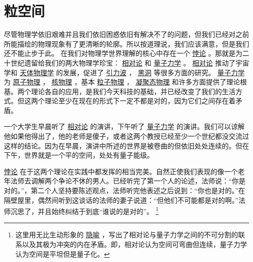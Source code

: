 	\chapter{粒空间}
\indent

    尽管物理学依旧艰难并且我们依旧困惑依旧有解决不了的问题，但我们已经对之前所能描绘的物理现象有了更清晰的轮廓。所以按道理说，我们应该满意，但是我们还不能止步于此。
    在我们对物理学世界理解的核心中存在一个
\href{http://toyhouse.cc/wiki/index.php/悖论}{悖论}
。那就是为二十世纪遗留给我们的两大物理学珍宝：
\href{http://toyhouse.cc/wiki/index.php/相对论}{相对论}
和
\href{http://toyhouse.cc/wiki/index.php/量子力学}{量子力学}
。
\href{http://toyhouse.cc/wiki/index.php/相对论}{相对论}
推动了宇宙学和
\href{http://toyhouse.cc/wiki/index.php/天体物理学}{天体物理学}
的发展，促进了
\href{http://toyhouse.cc/wiki/index.php/引力波}{引力波}
，
\href{http://toyhouse.cc/wiki/index.php/黑洞}{黑洞}
等很多方面的研究。
\href{http://toyhouse.cc/wiki/index.php/量子力学}{量子力学}
为
\href{http://toyhouse.cc/wiki/index.php/原子物理}{原子物理}
，
\href{http://toyhouse.cc/wiki/index.php/核物理}{核物理}
，基本
\href{http://toyhouse.cc/wiki/index.php/粒子物理}{粒子物理}
，
\href{http://toyhouse.cc/wiki/index.php/凝聚态物理}{凝聚态物理}
和许多方面提供了理论根基。两个理论各自的应用，是我们今天科技的基础，并已经改变了我们的生活方式。但这两个理论至少在现在的形式下一定不都是对的，因为它们之间存在着矛盾。



    一个大学生早晨听了
\href{http://toyhouse.cc/wiki/index.php/相对论}{相对论}
的演讲，下午听了
\href{http://toyhouse.cc/wiki/index.php/量子力学}{量子力学}
的演讲。我们可以谅解他如果他得出了，他的老师是傻子，或者这两个教授已经至少一个世纪都没交流过这样的结论。因为在早晨，演讲中所述的世界是被卷曲的但依旧处处连续的。但在下午，世界就是一个平的空间，处处有量子能级。
    
\href{http://toyhouse.cc/wiki/index.php/悖论}{悖论}
在于这两个理论在实践中都发挥的相当完美。自然正使我们表现的像一个老年法师去调解两个争论不休的男人。已经听完了第一个人的论述，法师说：“你是对的。”，第二个人坚持要陈述观点，法师听完他表述之后说到：“你也是对的。”在隔壁屋里，偶然间听到这谈话的法师的妻子说道：“但他们不可能都是对的啊。”法师沉思了，并且始终纠结于到底“谁说的是对的”。
\footnote[1]
{ 
这里用无比生动形象的
\href{http://toyhouse.cc/wiki/index.php/隐喻}{隐喻}
，写出了相对论与量子力学之间的不可分割的联系以及其极为冲突的内在矛盾。即，相对论认为空间可弯曲但连续，量子力学认为空间是平坦但是量子化。
}

